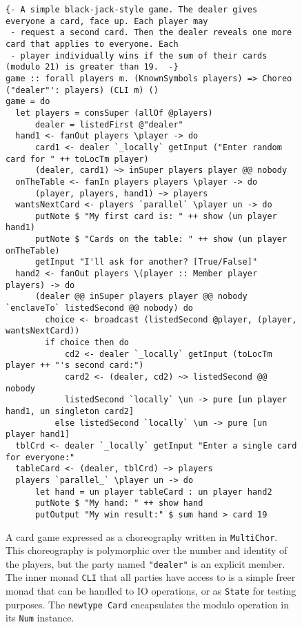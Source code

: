 \documentclass[sigplan,screen]{acmart}
\newcommand{\inlinecode}[2][haskell]{\texttt{#2}}
\newcommand{\MultiChor}{\texttt{Multi\-Chor}\xspace}
\begin{document}
\begin{figure*}[tbhp]
    \begin{mdframed}
\begin{verbatim}
{- A simple black-jack-style game. The dealer gives everyone a card, face up. Each player may
 - request a second card. Then the dealer reveals one more card that applies to everyone. Each
 - player individually wins if the sum of their cards (modulo 21) is greater than 19.  -}
game :: forall players m. (KnownSymbols players) => Choreo ("dealer"': players) (CLI m) ()
game = do
  let players = consSuper (allOf @players)
      dealer = listedFirst @"dealer"
  hand1 <- fanOut players \player -> do
      card1 <- dealer `_locally` getInput ("Enter random card for " ++ toLocTm player)
      (dealer, card1) ~> inSuper players player @@ nobody
  onTheTable <- fanIn players players \player -> do
      (player, players, hand1) ~> players
  wantsNextCard <- players `parallel` \player un -> do
      putNote $ "My first card is: " ++ show (un player hand1)
      putNote $ "Cards on the table: " ++ show (un player onTheTable)
      getInput "I'll ask for another? [True/False]"
  hand2 <- fanOut players \(player :: Member player players) -> do
      (dealer @@ inSuper players player @@ nobody `enclaveTo` listedSecond @@ nobody) do
        choice <- broadcast (listedSecond @player, (player, wantsNextCard))
        if choice then do
            cd2 <- dealer `_locally` getInput (toLocTm player ++ "'s second card:")
            card2 <- (dealer, cd2) ~> listedSecond @@ nobody
            listedSecond `locally` \un -> pure [un player hand1, un singleton card2]
          else listedSecond `locally` \un -> pure [un player hand1]
  tblCrd <- dealer `_locally` getInput "Enter a single card for everyone:"
  tableCard <- (dealer, tblCrd) ~> players
  players `parallel_` \player un -> do
      let hand = un player tableCard : un player hand2
      putNote $ "My hand: " ++ show hand
      putOutput "My win result:" $ sum hand > card 19
\end{verbatim}
    \caption{A card game expressed as a choreography written in \MultiChor.
             This choreography is polymorphic over the number and identity of the players,
             but the party named \inlinecode{"dealer"} is an explicit member.
             The inner monad \inlinecode{CLI} that all parties have access to is a simple freer monad
             that can be handled to IO operations, or as \inlinecode{State} for testing purposes.
             The \inlinecode{newtype Card} encapsulates the modulo operation in its
             \inlinecode{Num} instance.}
    \label{fig:card-game}
    \end{mdframed}
\end{figure*}
\end{document}
